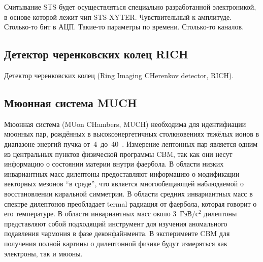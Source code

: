 Считывание STS будет осуществляться специально разработанной электроникой, в основе которой лежит чип STS-XYTER.
Чувствительный к амплитуде.
Столько-то бит в АЦП.
Такие-то параметры по времени.
Столько-то каналов.



\subsection{Детектор черенковских колец RICH}\label{sec:secRICH}

Детектор черенковских колец (Ring Imaging CHerenkov detector, RICH).



\subsection{Мюонная система MUCH}\label{sec:secMUCH}


Мюонная система (MUon CHambers, MUCH) необходима для идентифиации мюонных пар, рождённых в высокоэнергетичных столкновениях тяжёлых ионов в диапазоне энергий пучка от~4~до~40~\GeVperNucl. Измерение лептонных пар является одним из центральных пунктов физической программы CBM, так как они несут информацию о состоянии материи внутри фаербола. В области низких инвариантных масс дилептоны предоставляют информацию о модификации векторных мезонов ``в среде'', что является многообещающей наблюдаемой о восстановлении киральной симметрии. В области средних инвариантных масс в спектре дилептонов преобладает termal \todo радиация от фаербола, которая говорит о его температуре. В области инвариантных масс около 3~ГэВ/с$^{2} $ дилептоны представляют собой подходящий инструмент для изучения аномального подавления чармония в фазе деконфайнмента. В эксперименте CBM для получения полной картины о дилептонной физике будут измеряться как электроны, так и мюоны.

